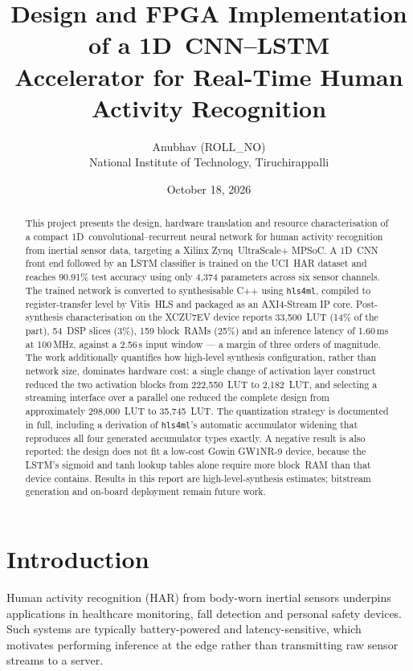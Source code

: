 \documentclass[11pt,a4paper]{article}
\title{\textbf{Design and FPGA Implementation of a 1D~CNN--LSTM\\
Accelerator for Real-Time Human Activity Recognition}}
\author{Anubhav (ROLL\_NO) \\
National Institute of Technology, Tiruchirappalli}
\date{October 18, 2026}
\begin{document}
\maketitle

\begin{abstract}
This project presents the design, hardware translation and resource
characterisation of a compact 1D~convolutional--recurrent neural network for
human activity recognition from inertial sensor data, targeting a Xilinx
Zynq~UltraScale+ MPSoC. A 1D~CNN front end followed by an LSTM classifier is
trained on the UCI~HAR dataset and reaches 90.91\% test accuracy using only
4{,}374 parameters across six sensor channels. The trained network is converted
to synthesisable C++ using \texttt{hls4ml}, compiled to register-transfer level
by Vitis~HLS and packaged as an AXI4-Stream IP core. Post-synthesis
characterisation on the XCZU7EV device reports 33{,}500~LUT (14\% of the part),
54~DSP slices (3\%), 159 block~RAMs (25\%) and an inference latency of
1.60\,ms at 100\,MHz, against a 2.56\,s input window --- a margin of three
orders of magnitude. The work additionally quantifies how high-level synthesis
configuration, rather than network size, dominates hardware cost: a single
change of activation layer construct reduced the two activation blocks from
222{,}550~LUT to 2{,}182~LUT, and selecting a streaming interface over a
parallel one reduced the complete design from approximately 298{,}000~LUT to
35{,}745~LUT. The quantization strategy is documented in full, including a derivation of
\texttt{hls4ml}'s automatic accumulator widening that reproduces all four
generated accumulator types exactly. A negative result is also reported: the
design does not fit a low-cost Gowin GW1NR-9 device, because the LSTM's sigmoid and tanh lookup
tables alone require more block~RAM than that device contains. Results in this
report are high-level-synthesis estimates; bitstream generation and on-board
deployment remain future work.
\end{abstract}

\tableofcontents
\newpage

\section{Introduction}

Human activity recognition (HAR) from body-worn inertial sensors underpins
applications in healthcare monitoring, fall detection and personal safety
devices. Such systems are typically battery-powered and latency-sensitive,
which motivates performing inference at the edge rather than transmitting raw
sensor streams to a server.
\end{document}
